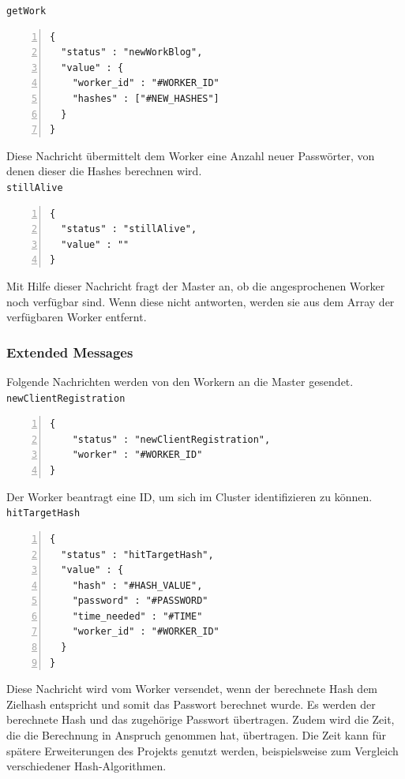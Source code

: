 \texttt{getWork}
\begin{lstlisting}[basicstyle=\ttfamily,numbers=left,numberstyle=\footnotesize\ttfamily,backgroundcolor=\color{sourcegray}]
{
  "status" : "newWorkBlog",
  "value" : {
    "worker_id" : "#WORKER_ID"
    "hashes" : ["#NEW_HASHES"]
  }
}\end{lstlisting}
Diese Nachricht übermittelt dem Worker eine Anzahl neuer Passwörter, von denen dieser die Hashes berechnen wird.\\

\texttt{stillAlive}
\begin{lstlisting}[basicstyle=\ttfamily,numbers=left,numberstyle=\footnotesize\ttfamily,backgroundcolor=\color{sourcegray}]
{
  "status" : "stillAlive",
  "value" : ""
}
\end{lstlisting}
Mit Hilfe dieser Nachricht fragt der Master an, ob die angesprochenen Worker noch verfügbar sind. Wenn diese nicht antworten, werden sie aus dem Array der verfügbaren Worker entfernt.


\subsubsection{Extended Messages}
Folgende Nachrichten werden von den Workern an die Master gesendet. \\

\texttt{newClientRegistration}
\begin{lstlisting}[basicstyle=\ttfamily,numbers=left,numberstyle=\footnotesize\ttfamily,backgroundcolor=\color{sourcegray}]
{
  	"status" : "newClientRegistration",
	"worker" : "#WORKER_ID"
}
\end{lstlisting}
Der Worker beantragt eine ID, um sich im Cluster identifizieren zu können.\\

\texttt{hitTargetHash}
\begin{lstlisting}[basicstyle=\ttfamily,numbers=left,numberstyle=\footnotesize\ttfamily,backgroundcolor=\color{sourcegray}]
{
  "status" : "hitTargetHash",
  "value" : {
    "hash" : "#HASH_VALUE",
    "password" : "#PASSWORD"
    "time_needed" : "#TIME"
    "worker_id" : "#WORKER_ID"
  }
}\end{lstlisting}
Diese Nachricht wird vom Worker versendet, wenn der berechnete Hash dem Zielhash entspricht und somit das Passwort berechnet wurde. Es werden der berechnete Hash und das zugehörige Passwort übertragen. Zudem wird die Zeit, die die Berechnung in Anspruch genommen hat, übertragen. Die Zeit kann für spätere Erweiterungen des Projekts genutzt werden, beispielsweise zum Vergleich verschiedener Hash-Algorithmen.\\

